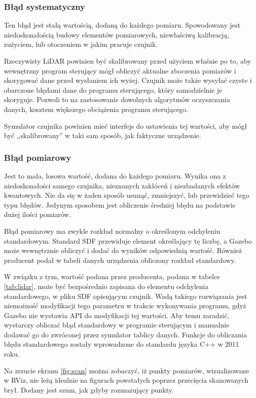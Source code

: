 		\subsubsection{Błąd systematyczny}
			Ten błąd jest stałą wartością, dodaną do każdego pomiaru.
			Spowodowany jest niedoskonałością budowy elementów pomiarowych, niewłaściwą kalibracją, zużyciem, lub otoczeniem w jakim pracuje czujnik.

			Rzeczywisty LiDAR powinien być skalibrowany przed użyciem właśnie po to, aby wewnętrzny program sterujący mógł obliczyć aktualne zboczenia pomiarów
			i skorygować dane przed wysłaniem ich wyżej.
			Czujnik może także wysyłać czyste i obarczone błędami dane do programu sterującego, który samodzielnie je skoryguje.
			Pozwoli to na zastosowanie dowolnych algorytmów oczyszczania danych, kosztem większego obciążenia programu sterującego.

			Symulator czujnika powinien mieć interfejs do ustawienia tej wartości, aby mógł być ,,skalibrowany'' w taki sam sposób, jak faktyczne urządzenie.

		\subsubsection{Błąd pomiarowy}
			Jest to mała, losowa wartość, dodana do każdego pomiaru.
			Wynika ona z niedoskonałości samego czujnika, nieznanych zakłóceń i niezbadanych efektów kwantowych.
			Nie da się w żaden sposób usunąć, zmniejszyć, lub przewidzieć tego typu błędów.
			Jedynym sposobem jest obliczenie średniej błędu na podstawie dużej ilości pomiarów.

			Błąd pomiarowy ma zwykle rozkład normalny o określonym odchyleniu standardowym.
			Standard SDF przewiduje element określający tę liczbę, a Gazebo może wewnętrznie obliczyć i dodać do wyników odpowiednią wartość.
			Również producent podał w tabeli danych urządzenia obliczony rozkład standardowy.

			W związku z tym, wartość podana przez producenta, podana w tabelce \ref{tab:lidar}, może być bezpośrednio zapisana do 
			elementu odchylenia standardowego, w pliku SDF opisującym czujnik.
			Wadą takiego rozwiązania jest niemożność modyfikacji tego parametru w trakcie wykonywania programu, gdyż Gazebo nie wystawia API do modyfikacji tej wartości.
			Aby temu zaradzić, wystarczy obliczać błąd standardowy w programie sterującym i manualnie dodawać go do zwróconej przez symulator tablicy danych.
			Funkcje do obliczania błędu standardowego zostały wprowadzone do standardu języka C++ w 2011 roku.
			
			Na zrzucie ekranu \ref{fig:scan} można zobaczyć, iż punkty pomiarów, wizualizowane w RViz, nie leżą idealnie na figurach powstałych poprzez przecięcia skanowanych brył.
			Dodany jest szum, jak gdyby rozmazujący punkty.

